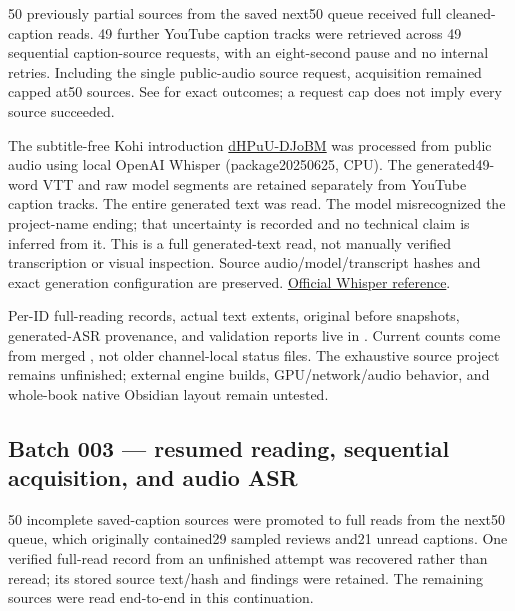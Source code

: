 \hypertarget{appendix-877738f6f4d2-batch-002-full-reading-and-audio-transcription-fallback}{}

50 previously partial sources from the saved next50 queue received full cleaned-caption reads. 49 further YouTube caption tracks were retrieved across 49 sequential caption-source requests, with an eight-second pause and no internal retries. Including the single public-audio source request, acquisition remained capped at50 sources. See  for exact outcomes; a request cap does not imply every source succeeded.

The subtitle-free Kohi introduction \href{https://www.youtube.com/watch?v=dHPuU-DJoBM}{dHPuU-DJoBM} was processed from public audio using local OpenAI Whisper  (package20250625, CPU). The generated49-word VTT and raw model segments are retained separately from YouTube caption tracks. The entire generated text was read. The model misrecognized the project-name ending; that uncertainty is recorded and no technical claim is inferred from it. This is a full generated-text read, not manually verified transcription or visual inspection. Source audio/model/transcript hashes and exact generation configuration are preserved. \href{https://github.com/openai/whisper}{Official Whisper reference}.

Per-ID full-reading records, actual text extents, original before snapshots, generated-ASR provenance, and validation reports live in . Current counts come from merged , not older channel-local status files. The exhaustive source project remains unfinished; external engine builds, GPU/network/audio behavior, and whole-book native Obsidian layout remain untested.

\subsection{Batch 003 --- resumed reading, sequential acquisition, and audio ASR}\label{appendix-877738f6f4d2-batch-003-resumed-reading-sequential-acquisition-and-audio-asr}

\hypertarget{appendix-877738f6f4d2-batch-003-resumed-reading-sequential-acquisition-and-audio-asr}{}

50 incomplete saved-caption sources were promoted to full reads from the next50 queue, which originally contained29 sampled reviews and21 unread captions. One verified full-read record from an unfinished attempt was recovered rather than reread; its stored source text/hash and findings were retained. The remaining sources were read end-to-end in this continuation.

